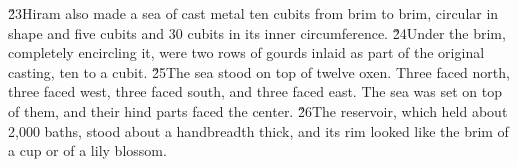 \v{23}Hiram also made a sea of cast metal ten cubits from brim to brim, circular in shape and five cubits and 30 cubits in its inner circumference. \v{24}Under the brim, completely encircling it, were two rows of gourds inlaid as part of the original casting, ten to a cubit. \v{25}The sea stood on top of twelve oxen. Three faced north, three faced west, three faced south, and three faced east. The sea was set on top of them, and their hind parts faced the center. \v{26}The reservoir, which held about 2,000 baths, stood about a handbreadth thick, and its rim looked like the brim of a cup or of a lily blossom.


